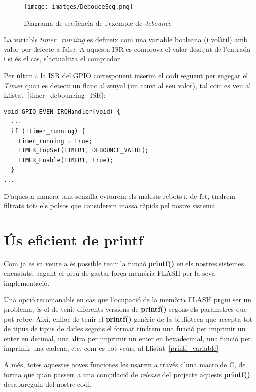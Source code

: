 \begin{figure}
 \centering
 \texttt{[image: imatges/DebouceSeq.png]}
 \caption{Diagrama de seqüència de l'exemple de {\em debounce}}
 \label{fig:TimerDebounce}
\end{figure}

La variable {\em timer\_running} es defineix com una variable booleana (i volàtil) amb valor per defecte a false. A aquesta \gls{ISR} es comprova el valor desitjat de l'entrada i si és el cas, s'actualitza el comptador.

Per últim a la ISR del \gls{GPIO} corresponent inserim el codi següent per engegar el {\em Timer} quan es detecti un flanc al senyal (un canvi al seu valor), tal com es veu al Llistat~\ref{timer_debouncing_ISR}:

\begin{lstlisting}[style=customc, caption=Codi per engegar el timer a la ISR del GPIO, label=timer_debouncing_ISR]
void GPIO_EVEN_IRQHandler(void) {
  ...
  if (!timer_running) {
    timer_running = true;
    TIMER_TopSet(TIMER1, DEBOUNCE_VALUE);
    TIMER_Enable(TIMER1, true);
  }
...
\end{lstlisting}

D'aquesta manera tant senzilla evitarem els molests rebots i, de fet, tindrem filtrats tots els polsos que considerem massa ràpids pel nostre sistema.

\section{Ús eficient de printf}

Com ja es va veure a  és possible tenir la funció {\bf printf()} en els nostres sistemes encastats, pagant el preu de gastar força memòria \gls{FLASH} per la seva implementació.

Una opció recomanable en cas que l'ocupació de la memòria FLASH pugui ser un problema, és el de tenir diferents versions de {\bf printf()} segons els paràmetres que pot rebre. Així, enlloc de tenir el {\bf printf()} genèric de la biblioteca que accepta tot de tipus de tipus de dades segons el format tindrem una funció per imprimir un enter en decimal, una altra per imprimir un enter en hexadecimal, una funció per imprimir una cadena, etc. com es pot veure al Llistat~\ref{printf_variable}

A més, totes aquestes noves funciones les usarem a través d'una \gls{macro} de C, de forma que quan passem a una compilació de {\em release} del projecte aquests {\bf printf()} desapareguin del nostre codi. 

